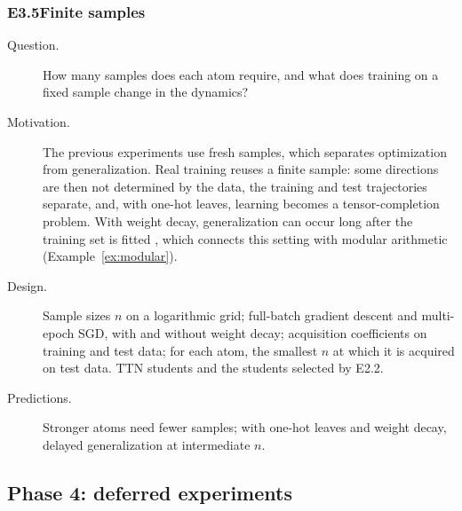 \documentclass[11pt]{article}
\theoremstyle{definition}
\numberwithin{equation}{section}
\begin{document}
\subsubsection*{E3.5\quad Finite samples}
\begin{description}
\item[Question.] How many samples does each atom require, and what does training on a fixed sample change in the dynamics?
\item[Motivation.] The previous experiments use fresh samples, which separates optimization from generalization. Real training reuses a finite sample: some directions are then not determined by the data, the training and test trajectories separate, and, with one-hot leaves, learning becomes a tensor-completion problem. With weight decay, generalization can occur long after the training set is fitted \citep{power2022grokking}, which connects this setting with modular arithmetic (Example~\ref{ex:modular}).
\item[Design.] Sample sizes $n$ on a logarithmic grid; full-batch gradient descent and multi-epoch SGD, with and without weight decay; acquisition coefficients on training and test data; for each atom, the smallest $n$ at which it is acquired on test data. TTN students and the students selected by E2.2.
\item[Predictions.] Stronger atoms need fewer samples; with one-hot leaves and weight decay, delayed generalization at intermediate $n$.
\end{description}

\subsection{Phase 4: deferred experiments}\label{sec:exp-phase4}
\end{document}
